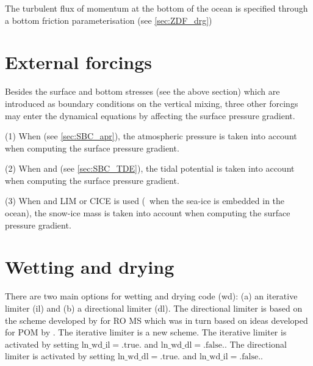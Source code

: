 \documentclass[../main/NEMO_manual]{subfiles}
\begin{document}
The turbulent flux of momentum at the bottom of the ocean is specified through a bottom friction parameterisation
(see \autoref{sec:ZDF_drg})

\section{External forcings}
\label{sec:DYN_forcing}

Besides the surface and bottom stresses (see the above section)
which are introduced as boundary conditions on the vertical mixing,
three other forcings may enter the dynamical equations by affecting the surface pressure gradient.

(1) When  (see \autoref{sec:SBC_apr}),
the atmospheric pressure is taken into account when computing the surface pressure gradient.

(2) When  and  (see \autoref{sec:SBC_TDE}),
the tidal potential is taken into account when computing the surface pressure gradient.

(3) When  and LIM or CICE is used
(\ie\ when the sea-ice is embedded in the ocean),
the snow-ice mass is taken into account when computing the surface pressure gradient.


\section{Wetting and drying }
\label{sec:DYN_wetdry}

There are two main options for wetting and drying code (wd):
(a) an iterative limiter (il) and (b) a directional limiter (dl).
The directional limiter is based on the scheme developed by \cite{warner.defne.ea_CG13} for RO
MS
which was in turn based on ideas developed for POM by \cite{oey_OM06}. The iterative
limiter is a new scheme.  The iterative limiter is activated by setting $\mathrm{ln\_wd\_il} = \mathrm{.true.}$
and $\mathrm{ln\_wd\_dl} = \mathrm{.false.}$. The directional limiter is activated
by setting $\mathrm{ln\_wd\_dl} = \mathrm{.true.}$ and $\mathrm{ln\_wd\_il} = \mathrm{.false.}$.
\end{document}

